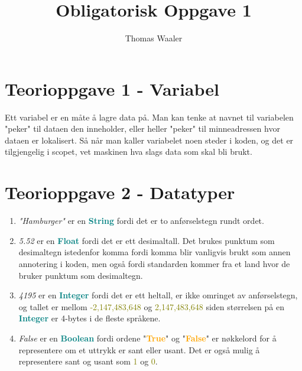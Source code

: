 \documentclass[10pt,a4paper]{article}
\author{Thomas Waaler}
\title{Obligatorisk Oppgave 1}
\begin{document}
\maketitle

\section*{Teorioppgave 1 - Variabel}
Ett variabel er en måte å lagre data på. Man kan tenke at navnet til variabelen "peker" til dataen den inneholder, eller heller "peker" til minneadressen hvor dataen er lokalisert. Så når man kaller variabelet noen steder i koden, og det er tilgjengelig i scopet, vet maskinen hva slags data som skal bli brukt.

\medskip 

\section*{Teorioppgave 2 - Datatyper}
\begin{enumerate}[label=\alph*)]
	\item \textit{"Hamburger"} er en \textcolor{teal}{\textbf{String}} fordi det er to anførselstegn rundt ordet.
	
	\item \textit{5.52} er en \textcolor{teal}{\textbf{Float}} fordi det er ett desimaltall. Det brukes punktum som desimaltegn istedenfor komma fordi komma blir vanligvis brukt som annen annotering i koden, men også fordi standarden kommer fra et land hvor de bruker punktum som desimaltegn.
	
	\item \textit{4195} er en \textcolor{teal}{\textbf{Integer}} fordi det er ett heltall, er ikke omringet av anførselstegn, og tallet er mellom \textcolor{olive}{-2,147,483,648} og \textcolor{olive}{2,147,483,648} siden størrelsen på en \textcolor{teal}{\textbf{Integer}} er 4-bytes i de fleste språkene. \cite{integer}
	
	\item \textit{False} er en \textcolor{teal}{\textbf{Boolean}} fordi ordene "\textcolor{orange}{\textbf{True}}" og "\textcolor{orange}{\textbf{False}}" er nøkkelord for å representere om et uttrykk er sant eller usant. Det er også mulig å representere sant og usant som \textcolor{olive}{1} og \textcolor{olive}{0}.
\end{enumerate}

\bigskip

\printbibliography[title={Kilder}]
\end{document}

